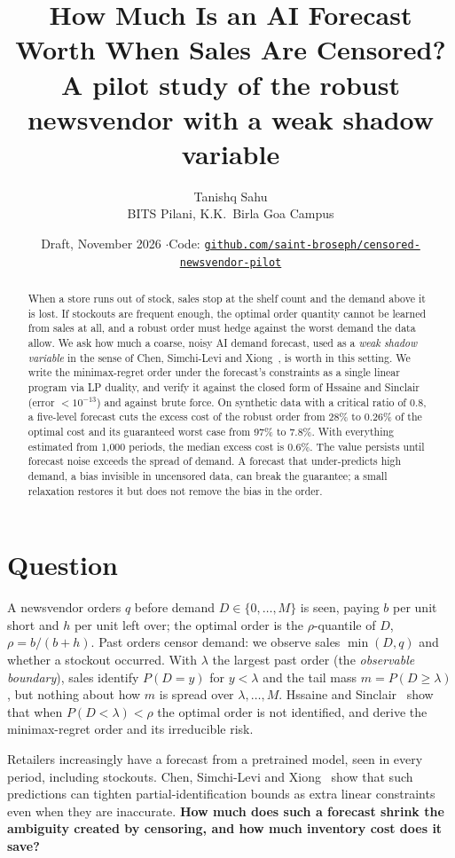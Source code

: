 \documentclass[10pt]{article}
\title{How Much Is an AI Forecast Worth When Sales Are Censored?\\[2pt]
\large A pilot study of the robust newsvendor with a weak shadow variable}
\author{Tanishq Sahu\\ {\small BITS Pilani, K.K.\ Birla Goa Campus}}
\date{{\small Draft, November 2026 \quad$\cdot$\quad Code: \href{https://github.com/saint-broseph/censored-newsvendor-pilot}{\texttt{github.com/saint-broseph/censored-newsvendor-pilot}}}}
\begin{document}
\maketitle

\begin{abstract}
\noindent When a store runs out of stock, sales stop at the shelf count and the demand above it is lost. If stockouts are frequent enough, the optimal order quantity cannot be learned from sales at all, and a robust order must hedge against the worst demand the data allow. We ask how much a coarse, noisy AI demand forecast, used as a \emph{weak shadow variable} in the sense of Chen, Simchi-Levi and Xiong~\cite{csx}, is worth in this setting. We write the minimax-regret order under the forecast's constraints as a single linear program via LP duality, and verify it against the closed form of Hssaine and Sinclair~\cite{hs} (error $<10^{-13}$) and against brute force. On synthetic data with a critical ratio of 0.8, a five-level forecast cuts the excess cost of the robust order from 28\% to 0.26\% of the optimal cost and its guaranteed worst case from 97\% to 7.8\%. With everything estimated from 1{,}000 periods, the median excess cost is 0.6\%. The value persists until forecast noise exceeds the spread of demand. A forecast that under-predicts high demand, a bias invisible in uncensored data, can break the guarantee; a small relaxation restores it but does not remove the bias in the order.
\end{abstract}

\section{Question}
A newsvendor orders $q$ before demand $D\in\{0,\dots,M\}$ is seen, paying $b$ per unit short and $h$ per unit left over; the optimal order is the $\rho$-quantile of $D$, $\rho=b/(b+h)$. Past orders censor demand: we observe sales $\min(D,q)$ and whether a stockout occurred. With $\lambda$ the largest past order (the \emph{observable boundary}), sales identify $P(D=y)$ for $y<\lambda$ and the tail mass $m=P(D\ge\lambda)$, but nothing about how $m$ is spread over $\lambda,\dots,M$. Hssaine and Sinclair~\cite{hs} show that when $P(D<\lambda)<\rho$ the optimal order is not identified, and derive the minimax-regret order and its irreducible risk.

Retailers increasingly have a forecast from a pretrained model, seen in every period, including stockouts. Chen, Simchi-Levi and Xiong~\cite{csx} show that such predictions can tighten partial-identification bounds as extra linear constraints even when they are inaccurate. \textbf{How much does such a forecast shrink the ambiguity created by censoring, and how much inventory cost does it save?}
\end{document}
